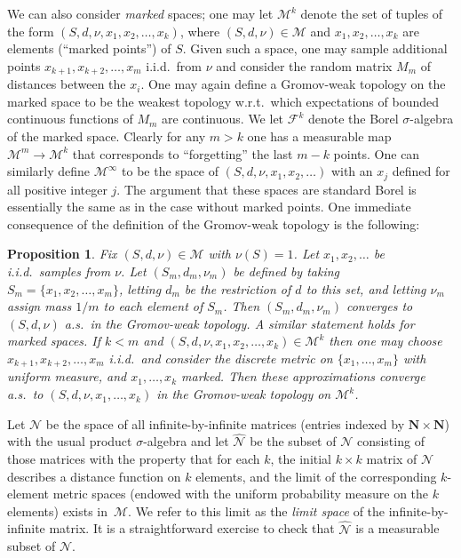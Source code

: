 \documentclass[10pt]{amsart}
\let\mathcal\mathscr
\theoremstyle{plain}
\numberwithin{theorem}{section}
\newtheorem{proposition}[theorem]{Proposition}
\theoremstyle{definition}
\newcommand\mmspace{{\mathcal M}}
\newcommand\mmsigma{{\mathcal F}}
\newcommand{\matrixmspace}{\mathcal N}
\newcommand{\N}{\mathbf{N}}
\begin{document}
We can also consider \emph{marked} spaces; one may let $\mmspace^k$ denote the set of tuples of the form $(S,d, \nu, x_1,x_2, \ldots, x_k)$, where $(S,d,\nu) \in \mmspace$ and $x_1, x_2, \ldots, x_k$ are elements (``marked points'') of $S$. Given such a space, one may sample additional points $x_{k+1}, x_{k+2}, \ldots, x_m$ i.i.d.\ from $\nu$ and consider the random matrix $M_m$ of distances between the $x_i$. One may again define a Gromov-weak topology on the marked space to be the weakest topology w.r.t.\ which expectations of bounded continuous functions of $M_m$ are continuous. We let $\mmsigma^k$ denote the Borel $\sigma$-algebra of the marked space. Clearly for any $m > k$ one has a measurable map $\mmspace^m \to \mmspace^k$ that corresponds to ``forgetting'' the last $m-k$ points. One can similarly define $\mmspace^\infty$ to be the space of $(S, d, \nu, x_1, x_2, \ldots)$ with an $x_j$ defined for all positive integer $j$. The argument that these spaces are standard Borel is essentially the same as in the case without marked points. One immediate consequence of the definition of the Gromov-weak topology is the following:

\begin{proposition}
\label{prop::randomapproximatemetricsconverge}
Fix $(S,d,\nu) \in \mmspace$ with $\nu(S) = 1$. Let $x_1, x_2, \ldots$ be i.i.d.\ samples from $\nu$. Let $(S_{m}, d_{m}, \nu_{m})$ be defined by taking $S_{m} = \{x_1, x_2, \ldots, x_{m} \}$, letting $d_{m}$ be the restriction of $d$ to this set, and letting $\nu_{m}$ assign mass $1/m$ to each element of $S_{m}$. Then $(S_{m}, d_{m}, \nu_{m})$ converges to $(S, d, \nu)$ a.s.\ in the Gromov-weak topology. A similar statement holds for marked spaces. If $k < m$ and $(S,d,\nu, x_1, x_2, \ldots, x_{k}) \in \mmspace^{k}$ then one may choose $x_{k+1}, x_{k+2}, \ldots, x_{m}$ i.i.d.\ and consider the discrete metric on $\{x_1, \ldots, x_{m} \}$ with uniform measure, and $x_1,\ldots, x_{k}$ marked. Then these approximations converge a.s.\ to $(S,d,\nu,x_1,\ldots,x_{k})$ in the Gromov-weak topology on $\mmspace^{k}$.
\end{proposition}

Let $\matrixmspace$ be the space of all infinite-by-infinite matrices (entries indexed by $\N \times \N$) with the usual product $\sigma$-algebra and let $\widehat{\matrixmspace}$ be the subset of $\matrixmspace$ consisting of those matrices with the property that for each $k$, the initial $k \times k$ matrix of $\matrixmspace$ describes a distance function on $k$ elements, and the limit of the corresponding $k$-element metric spaces (endowed with the uniform probability measure on the $k$ elements) exists in~$\mmspace$. We refer to this limit as the \emph{limit space} of the infinite-by-infinite matrix. It is a straightforward exercise to check that $\widehat {\matrixmspace}$ is a measurable subset of $\matrixmspace$.
\end{document}
